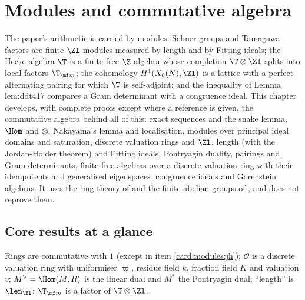 \chapter{Modules and commutative algebra}\label{ch:modules}

The paper's arithmetic is carried by modules: Selmer groups and Tamagawa factors are finite $\Zl$-modules measured by length and by
Fitting ideals; the Hecke algebra $\T$ is a finite free $\Z$-algebra whose completion $\T\otimes\Zl$ splits into local factors $\T_{\mf m}$; the
cohomology $H^1(X_0(N),\Zl)$ is a lattice with a perfect alternating pairing for which $\T$ is self-adjoint; and the inequality of Lemma lem:ddt417
compares a Gram determinant with a congruence ideal. This chapter develops, with complete proofs except where a reference is given, the commutative
algebra behind all of this: exact sequences and the snake lemma, $\Hom$ and $\otimes$, Nakayama's lemma and localisation, modules over principal ideal
domains and saturation, discrete valuation rings and $\Zl$, length (with the Jordan-Holder theorem) and Fitting ideals, Pontryagin duality, pairings and
Gram determinants, finite free algebras over a discrete valuation ring with their idempotents and generalised eigenspaces, congruence ideals and
Gorenstein algebras. It uses the ring theory of  and the finite abelian groups of , and does not reprove them.

\section*{Core results at a glance}

Rings are commutative with $1$ (except in item \ref{card:modules:jh}); $\mathcal O$ is a discrete valuation ring with uniformiser $\varpi$, residue field $k$,
fraction field $K$ and valuation $v$; $M^\vee=\Hom(M,R)$ is the linear dual and $M^*$ the Pontryagin dual; ``length'' is $\len_{\Zl}$; $\T_{\mf m}$ is a factor
of $\T\otimes\Zl$.

